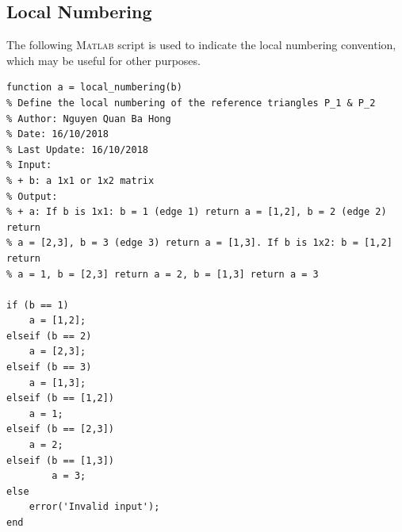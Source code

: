 \documentclass[11pt,a4paper,center,notitlepage]{article}
\numberwithin{equation}{section}
\begin{document}
\subsection{Local Numbering}
The following \textsc{Matlab} script is used to indicate the local numbering convention, which may be useful for other purposes.
\begin{verbatim}
function a = local_numbering(b)
% Define the local numbering of the reference triangles P_1 & P_2
% Author: Nguyen Quan Ba Hong
% Date: 16/10/2018
% Last Update: 16/10/2018
% Input:
% + b: a 1x1 or 1x2 matrix
% Output:
% + a: If b is 1x1: b = 1 (edge 1) return a = [1,2], b = 2 (edge 2) return 
% a = [2,3], b = 3 (edge 3) return a = [1,3]. If b is 1x2: b = [1,2] return
% a = 1, b = [2,3] return a = 2, b = [1,3] return a = 3

if (b == 1)
    a = [1,2];
elseif (b == 2)
    a = [2,3];
elseif (b == 3)
    a = [1,3];
elseif (b == [1,2])
    a = 1;
elseif (b == [2,3])
    a = 2;
elseif (b == [1,3])
        a = 3;
else
    error('Invalid input');
end
\end{verbatim}
\end{document}
